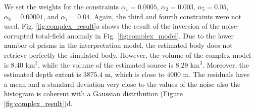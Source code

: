 We set the weights for the constraints $\alpha_1 = 0.0005$, $\alpha_2 = 0.003$, $\alpha_5 = 0.05$, $\alpha_6 = 0.00001$, and $\alpha_7 = 0.04$. Again, the third and fourth constraints were not used. Fig. \ref{fig:complex_result}a shows the result of the inversion of the noise-corrupted total-field anomaly in Fig. \ref{fig:complex_model}. Due to the lower number of prisms in the interpretation model, the estimated body does not retrieve perfectly the simulated body. However, the volume of the complex model is $8.40$ km$^3$, while the volume of the estimated source is $8.29$ km$^3$. Moreover, the estimated depth extent is $3875.4$ m, which is close to $4000$ m. The residuals have a mean and a standard deviation very close to the values of the noise also the histogram is coherent with a Gaussian distribution (Figure \ref{fig:complex_result})d.


